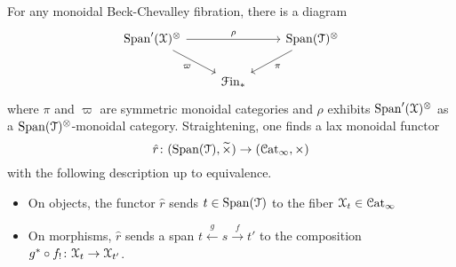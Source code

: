 \documentclass[main.tex]{subfiles}
\begin{document}
\begin{proposition}
  For any monoidal Beck-Chevalley fibration, there is a diagram
  \begin{equation*}
    \begin{tikzcd}
      \Span'(\category{X})^{\otimes}
      \arrow[rr, "\rho"]
      \arrow[dr, swap, "\varpi"]
      && \Span(\category{T})^{\otimes}
      \arrow[dl, "\pi"]
      \\
      & \Finp
    \end{tikzcd}
  \end{equation*}
  where $\pi$ and $\varpi$ are symmetric monoidal categories and $\rho$ exhibits $\mathrm{Span}'(\mathcal{X})^{\otimes}$ as a $\mathrm{Span}(\mathcal{T})^{\otimes}$-monoidal category. Straightening, one finds a lax monoidal functor
  \begin{equation*}
    \hat{r}\colon (\mathrm{Span}(\mathcal{T}), \widetilde{\times}) \to (\mathcal{C}\mathrm{at}_{\infty}, \times)
  \end{equation*}
  with the following description up to equivalence.
  \begin{itemize}
    \item On objects, the functor $\hat{r}$ sends $t \in \mathrm{Span}(\mathcal{T})$ to the fiber $\mathcal{X}_{t} \in \mathcal{C}\mathrm{at}_{\infty}$
    \item On morphisms, $\hat{r}$ sends a span $t \overset{g}{\leftarrow} s \overset{f}{\to} t'$ to the composition $g^{*} \circ f_{!}\colon \mathcal{X}_{t} \to \mathcal{X}_{t'}$.
  \end{itemize}
\end{proposition}
\end{document}
